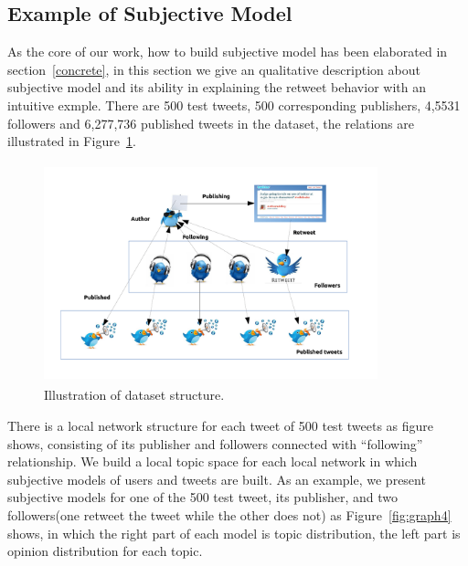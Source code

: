 \documentclass[preprint]{elsarticle}
\begin{document}
\subsection{Example of Subjective Model}
\label{example}
As the core of our work, how to build subjective model has been elaborated in section~\ref{concrete}, in this section we give an qualitative description about subjective model and its ability in explaining the retweet behavior with an intuitive exmple. 
There are 500 test tweets, 500 corresponding publishers, 4,5531 followers and 6,277,736 published tweets in the dataset, the relations are illustrated in Figure~\ref{fig:graph3}.
\begin{figure}[htb]
\setlength{\belowcaptionskip}{-0.2cm} 
\centering%
\includegraphics[width=3.8in,height=2.5in]{dataset.pdf}
\vspace{-4em}\caption{Illustration of dataset structure.}
\label{fig:graph3}
\end{figure}
There is a local network structure for each tweet of 500 test tweets as figure shows, consisting of its publisher and followers connected with ``following'' relationship.
We build a local topic space for each local network in which subjective models of users and tweets are built.
As an example, we present subjective models for one of the 500 test tweet, its publisher, and two followers(one retweet the tweet while the other does not) as Figure~\ref{fig:graph4} shows, in which the right part of each model is topic distribution, the left part is opinion distribution for each topic.
\end{document}
